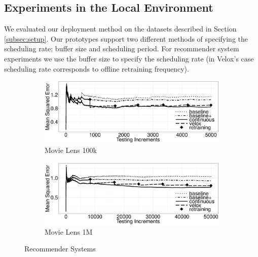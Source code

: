 \documentclass{vldb}
\begin{document}
\subsection{Experiments in the Local Environment}\label{subsec:experiment-local}
We evaluated our deployment method on the datasets described in Section \ref{subsec:setup}.
Our prototypes support two different methods of specifying the scheduling rate; buffer size and scheduling period.
For recommender system experiments we use the buffer size to specify the scheduling rate (in Velox's case scheduling rate corresponds to offline retraining frequency).
\begin{figure}[h]
\begin{subfigure}{\columnwidth}
	\includegraphics[width=\columnwidth]{../images/experiment-results/movie-lens-100k-quality-improved.eps}
	\caption{Movie Lens 100k}
	\label{fig:movie-lens-100k-score}
\end{subfigure}
\begin{subfigure}{\columnwidth}
  \includegraphics[width=\columnwidth]{../images/experiment-results/movie-lens-1m-quality-improved.eps}
\caption{Movie Lens 1M}
\label{fig:movie-lens-1M-score}
\end{subfigure}
\vspace{2mm}
\caption{Recommender Systems}
\end{figure}
\end{document}
